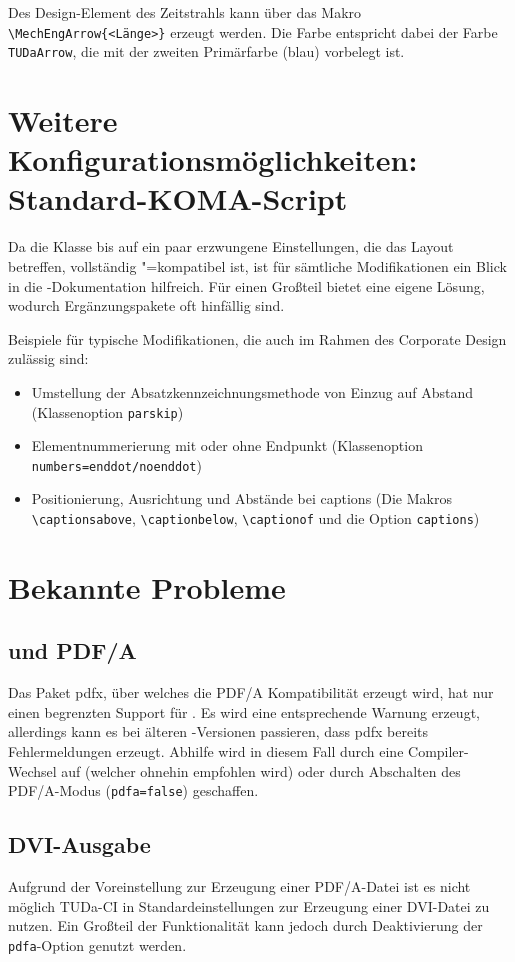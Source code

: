 \documentclass[
	ngerman,%
	accentcolor=9c,%
]{tudapub}
\newcommand*{\code}[1]{\texttt{#1}}
\newcommand*{\pkg}[1]{\textsf{#1}}
\begin{document}
Des Design-Element des Zeitstrahls kann über das Makro \verb+\MechEngArrow{<Länge>}+ erzeugt werden. Die Farbe entspricht dabei der Farbe \code{TUDaArrow}, die mit der zweiten Primärfarbe (blau) vorbelegt ist.

\section{Weitere Konfigurationsmöglichkeiten: Standard-KOMA-Script}
\label{sec:KOMA}
Da die Klasse bis auf ein paar erzwungene Einstellungen, die das Layout betreffen, vollständig \KOMAScript"=kompatibel ist, ist für sämtliche Modifikationen ein Blick in die \KOMAScript-Dokumentation hilfreich. Für einen Großteil bietet \KOMAScript{} eine eigene Lösung, wodurch Ergänzungspakete oft hinfällig sind.

Beispiele für typische Modifikationen, die auch im Rahmen des Corporate Design zulässig sind:
\begin{itemize}
	\item Umstellung der Absatzkennzeichnungsmethode von Einzug auf Abstand (Klassenoption \verb+parskip+)
	\item Elementnummerierung mit oder ohne Endpunkt (Klassenoption \verb+numbers=enddot/noenddot+)
	\item Positionierung, Ausrichtung und Abstände bei captions (Die Makros \verb+\captionsabove+, \verb+\captionbelow+, \verb+\captionof+ und die Option \verb+captions+)
\end{itemize}

\section{Bekannte Probleme}

\subsection{\texorpdfstring{}{XeLaTeX} und PDF/A}
Das Paket \pkg{pdfx}, über welches die PDF/A Kompatibilität erzeugt wird, hat nur einen begrenzten Support für .
Es wird eine entsprechende Warnung erzeugt, allerdings kann es bei älteren -Versionen passieren, dass \pkg{pdfx} bereits Fehlermeldungen erzeugt. Abhilfe wird in diesem Fall durch eine Compiler-Wechsel auf  (welcher ohnehin empfohlen wird) oder durch Abschalten des PDF/A-Modus (\code{pdfa=false})  geschaffen.

\subsection{DVI-Ausgabe}
Aufgrund der Voreinstellung zur Erzeugung einer PDF/A-Datei ist es nicht möglich TUDa-CI in Standardeinstellungen zur Erzeugung einer DVI-Datei zu nutzen. Ein Großteil der Funktionalität kann jedoch durch Deaktivierung der \code{pdfa}-Option genutzt werden.
\end{document}
